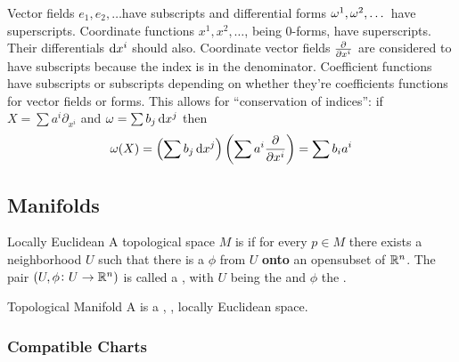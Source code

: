 Vector fields \(e_1, e_2, \dots\)have subscripts and differential forms \(\omega^1, \omega^2, \dots\) have superscripts.
%
Coordinate functions \(x^1, x^2, \dots\), being 0-forms, have superscripts.
%
Their differentials \(\dif x^i\) should also.
%
Coordinate vector fields \(\pdv{}{x^i}\) are considered to have subscripts because the index is in the denominator.
%
Coefficient functions have subscripts or subscripts depending on whether they're coefficients functions for vector fields or forms.
%
This allows for ``conservation of indices'': if \(X = \sum a^i \partial_{x^i}\) and \(\w = \sum b_j \dif x^j\) then
\[
    \w(X) = \left( \sum b_j \dif x^j \right) \left( \sum a^i \pdv{}{x^i} \right) = \sum b_i a^i
\]

\subsection{Manifolds}

\begin{definition}{Locally Euclidean}{}
    A topological space \(M\) is  if for every \(p \in M\) there exists a neighborhood \(U\) such that there is a  \(\phi\) from \(U\) \textbf{onto} an opensubset of \(\mathbb{R}^n\).
    The pair \(\left( U,\phi \colon U \rightarrow \mathbb{R}^n \right)\) is called a , with \(U\) being the  and \(\phi\) the .
\end{definition}

\begin{definition}{Topological Manifold}{}
    A  is a , , locally Euclidean space.
\end{definition}

\subsubsection{Compatible Charts}

